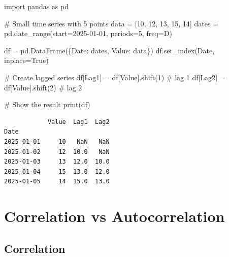 \documentclass[
  11pt,
  a4paper,
]{report}
\newenvironment{Shaded}{\begin{snugshade}}{\end{snugshade}}
\newcommand{\BuiltInTok}[1]{\textcolor[rgb]{0.00,0.23,0.31}{#1}}
\newcommand{\CommentTok}[1]{\textcolor[rgb]{0.37,0.37,0.37}{#1}}
\newcommand{\DecValTok}[1]{\textcolor[rgb]{0.68,0.00,0.00}{#1}}
\newcommand{\ImportTok}[1]{\textcolor[rgb]{0.00,0.46,0.62}{#1}}
\newcommand{\NormalTok}[1]{\textcolor[rgb]{0.00,0.23,0.31}{#1}}
\newcommand{\OperatorTok}[1]{\textcolor[rgb]{0.37,0.37,0.37}{#1}}
\newcommand{\StringTok}[1]{\textcolor[rgb]{0.13,0.47,0.30}{#1}}
\newcommand{\VariableTok}[1]{\textcolor[rgb]{0.07,0.07,0.07}{#1}}
\begin{document}
\begin{Shaded}
\begin{Highlighting}[]
\ImportTok{import}\NormalTok{ pandas }\ImportTok{as}\NormalTok{ pd}

\CommentTok{\# Small time series with 5 points}
\NormalTok{data }\OperatorTok{=}\NormalTok{ [}\DecValTok{10}\NormalTok{, }\DecValTok{12}\NormalTok{, }\DecValTok{13}\NormalTok{, }\DecValTok{15}\NormalTok{, }\DecValTok{14}\NormalTok{]}
\NormalTok{dates }\OperatorTok{=}\NormalTok{ pd.date\_range(start}\OperatorTok{=}\StringTok{\textquotesingle{}2025{-}01{-}01\textquotesingle{}}\NormalTok{, periods}\OperatorTok{=}\DecValTok{5}\NormalTok{, freq}\OperatorTok{=}\StringTok{\textquotesingle{}D\textquotesingle{}}\NormalTok{)}

\NormalTok{df }\OperatorTok{=}\NormalTok{ pd.DataFrame(\{}\StringTok{\textquotesingle{}Date\textquotesingle{}}\NormalTok{: dates, }\StringTok{\textquotesingle{}Value\textquotesingle{}}\NormalTok{: data\})}
\NormalTok{df.set\_index(}\StringTok{\textquotesingle{}Date\textquotesingle{}}\NormalTok{, inplace}\OperatorTok{=}\VariableTok{True}\NormalTok{)}

\CommentTok{\# Create lagged series}
\NormalTok{df[}\StringTok{\textquotesingle{}Lag1\textquotesingle{}}\NormalTok{] }\OperatorTok{=}\NormalTok{ df[}\StringTok{\textquotesingle{}Value\textquotesingle{}}\NormalTok{].shift(}\DecValTok{1}\NormalTok{)  }\CommentTok{\# lag 1}
\NormalTok{df[}\StringTok{\textquotesingle{}Lag2\textquotesingle{}}\NormalTok{] }\OperatorTok{=}\NormalTok{ df[}\StringTok{\textquotesingle{}Value\textquotesingle{}}\NormalTok{].shift(}\DecValTok{2}\NormalTok{)  }\CommentTok{\# lag 2}

\CommentTok{\# Show the result}
\BuiltInTok{print}\NormalTok{(df)}
\end{Highlighting}
\end{Shaded}

\begin{verbatim}
            Value  Lag1  Lag2
Date                         
2025-01-01     10   NaN   NaN
2025-01-02     12  10.0   NaN
2025-01-03     13  12.0  10.0
2025-01-04     15  13.0  12.0
2025-01-05     14  15.0  13.0
\end{verbatim}

\section{Correlation vs
Autocorrelation}\label{correlation-vs-autocorrelation}

\subsection{Correlation}\label{correlation}
\end{document}
